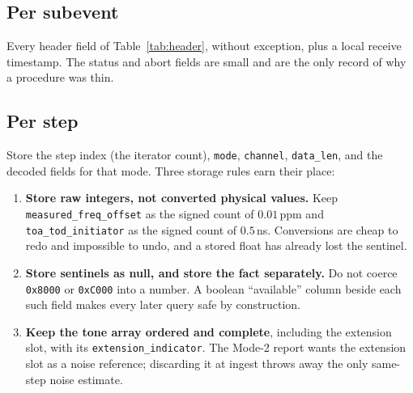 \documentclass[11pt,a4paper]{article}
\newcommand{\code}[1]{\texttt{\small #1}}
\begin{document}
\subsection{Per subevent}

Every header field of Table~\ref{tab:header}, without exception, plus a local receive timestamp. The
status and abort fields are small and are the only record of why a procedure was thin.

\subsection{Per step}

Store the step index (the iterator count), \code{mode}, \code{channel}, \code{data\_\allowbreak{}len}, and the
decoded fields for that mode. Three storage rules earn their place:

\begin{enumerate}[leftmargin=1.6em,itemsep=2pt]
  \item \textbf{Store raw integers, not converted physical values.} Keep
    \code{measured\_\allowbreak{}freq\_\allowbreak{}offset} as the signed count of $0.01$\,ppm and
    \code{toa\_\allowbreak{}tod\_\allowbreak{}initiator} as the signed count of $0.5$\,ns. Conversions are cheap to redo and
    impossible to undo, and a stored float has already lost the sentinel.
  \item \textbf{Store sentinels as null, and store the fact separately.} Do not coerce \code{0x8000}
    or \code{0xC000} into a number. A boolean ``available'' column beside each such field makes every
    later query safe by construction.
  \item \textbf{Keep the tone array ordered and complete}, including the extension slot, with its
    \code{extension\_\allowbreak{}indicator}. The Mode-2 report wants the extension slot as a noise reference;
    discarding it at ingest throws away the only same-step noise estimate.
  \end{enumerate}
\end{document}
